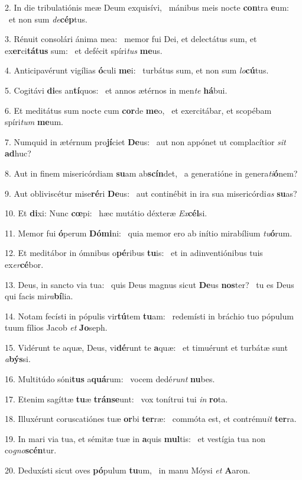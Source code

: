2. In die tribulatiónis meæ Deum exquisívi, \dag\  mánibus meis nocte \textbf{con}tra \textbf{e}um: \ast\  et non sum \textit{de}\textbf{cép}tus.\

3. Rénuit consolári ánima mea: \dag\  memor fui Dei, et delectátus sum, et ex\textbf{er}ci\textbf{tá}\textbf{tus} sum: \ast\  et defécit spíri\textit{tus} \textbf{me}us.\

4. Anticipavérunt vigílias \textbf{ó}culi \textbf{me}i: \ast\  turbátus sum, et non sum \textit{lo}\textbf{cú}tus.\

5. Cogitávi \textbf{di}es an\textbf{tí}quos: \ast\  et annos ætérnos in men\textit{te} \textbf{há}bui.\

6. Et meditátus sum nocte cum \textbf{cor}de \textbf{me}o, \ast\  et exercitábar, et scopébam spíri\textit{tum} \textbf{me}um.\

7. Numquid in ætérnum pro\textbf{jí}ciet \textbf{De}us: \ast\  aut non appónet ut complacítior \textit{sit} \textbf{ad}huc?\

8. Aut in finem misericórdiam \textbf{su}am ab\textbf{scín}det, \ast\  a generatióne in genera\textit{ti}\textbf{ó}nem?\

9. Aut obliviscétur mise\textbf{ré}ri \textbf{De}us: \ast\  aut continébit in ira sua misericórdi\textit{as} \textbf{su}as?\

10. Et \textbf{di}xi: Nunc \textbf{cœ}pi: \ast\  hæc mutátio déxteræ \textit{Ex}\textbf{cél}si.\

11. Memor fui \textbf{ó}perum \textbf{Dó}\textbf{mi}ni: \ast\  quia memor ero ab inítio mirabílium \textit{tu}\textbf{ó}rum.\

12. Et meditábor in ómnibus o\textbf{pé}ribus \textbf{tu}is: \ast\  et in adinventiónibus tuis ex\textit{er}\textbf{cé}bor.\

13. Deus, in sancto via tua: \dag\  quis Deus magnus sicut \textbf{De}us \textbf{nos}ter? \ast\  tu es Deus qui facis mi\textit{ra}\textbf{bí}lia.\

14. Notam fecísti in pópulis vir\textbf{tú}tem \textbf{tu}am: \ast\  redemísti in bráchio tuo pópulum tuum fílios Jacob \textit{et} \textbf{Jo}seph.\

15. Vidérunt te aquæ, Deus, vi\textbf{dé}runt te \textbf{a}quæ: \ast\  et timuérunt et turbátæ sunt \textit{a}\textbf{býs}si.\

16. Multitúdo sóni\textbf{tus} a\textbf{quá}rum: \ast\  vocem dedé\textit{runt} \textbf{nu}bes.\

17. Etenim sagíttæ \textbf{tu}æ \textbf{tráns}\textbf{e}unt: \ast\  vox tonítrui tui \textit{in} \textbf{ro}ta.\

18. Illuxérunt coruscatiónes tuæ \textbf{or}bi \textbf{ter}ræ: \ast\  commóta est, et contrému\textit{it} \textbf{ter}ra.\

19. In mari via tua, et sémitæ tuæ in \textbf{a}quis \textbf{mul}tis: \ast\  et vestígia tua non co\textit{gno}\textbf{scén}tur.\

20. Deduxísti sicut oves \textbf{pó}pulum \textbf{tu}um, \ast\  in manu Móysi \textit{et} \textbf{A}aron.\

